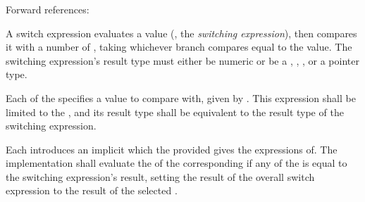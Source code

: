 
\begin{grammar}
 \\
	 \terminal{(}  \terminal{)} \terminal{\{}  \terminal{\}} \\

 \\
	  \\

 \\
	  \terminal{=>}  \\
	 \terminal{=>}  \\

 \\
	 \optional{\terminal{,}} \\
	 \terminal{,}  \\
\end{grammar}

Forward references: 

\specsubsubitem
A switch expression evaluates a value (, the
\textit{switching expression}), then compares it with a number of
, taking whichever branch compares equal to the value.
The switching expression's result type must either be numeric or be a
, , , or a pointer type.

\specsubsubitem
Each of the  specifies a value to compare with, given
by . This expression shall be limited to the
, and its result type shall be
equivalent to the result type of the switching expression.

\specsubsubitem
Each  introduces an implicit
 which the provided
 gives the expressions of. The implementation
shall evaluate the  of the corresponding
 if any of the  is equal to
the switching expression's result, setting the result of the overall switch
expression to the result of the selected .

